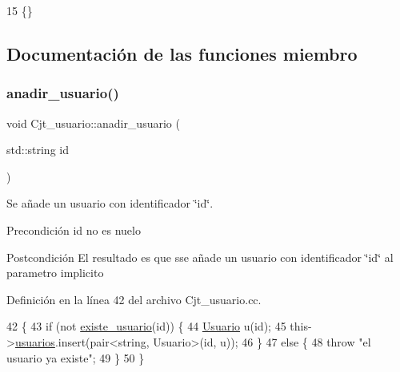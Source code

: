 \begin{DoxyCode}
15 \{\}
\end{DoxyCode}


\subsection{Documentación de las funciones miembro}
\mbox{\label{class_cjt__usuario_a1a587cd6e8e3f261f27981134d0216e5}} 
\subsubsection{\texorpdfstring{anadir\+\_\+usuario()}{anadir\_usuario()}}
{\footnotesize\ttfamily void Cjt\+\_\+usuario\+::anadir\+\_\+usuario (\begin{DoxyParamCaption}\item[{std\+::string}]{id }\end{DoxyParamCaption})}



Se añade un usuario con identificador \char`\"{}id\char`\"{}. 

\begin{DoxyPrecond}{Precondición}
id no es nuelo 
\end{DoxyPrecond}
\begin{DoxyPostcond}{Postcondición}
El resultado es que sse añade un usuario con identificador \char`\"{}id\char`\"{} al parametro implicito 
\end{DoxyPostcond}


Definición en la línea 42 del archivo Cjt\+\_\+usuario.\+cc.


\begin{DoxyCode}
42                                           \{
43   \textcolor{keywordflow}{if} (not \mbox{\hyperlink{class_cjt__usuario_a2d4478e6b967659040f5a0b86b665204}{existe\_usuario}}(\textcolor{keywordtype}{id})) \{
44     \mbox{\hyperlink{class_usuario}{Usuario}} u(\textcolor{keywordtype}{id});
45     this->\mbox{\hyperlink{class_cjt__usuario_af814d06f1c52bc2e744d253d20ce6e6b}{usuarios}}.insert(pair<string, Usuario>(\textcolor{keywordtype}{id}, u));
46   \}
47   \textcolor{keywordflow}{else} \{
48     \textcolor{keywordflow}{throw} \textcolor{stringliteral}{"el usuario ya existe"};
49   \}
50 \}
\end{DoxyCode}
\mbox{\label{class_cjt__usuario_a4be0bd7bbca32d299b152730d6de41ba}} 
